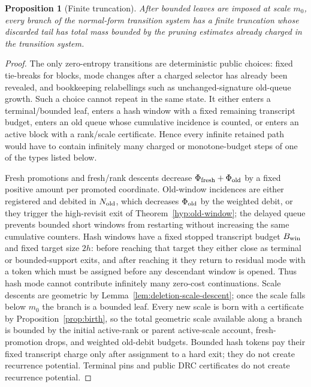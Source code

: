 \documentclass[11pt]{article}
\newtheorem{proposition}[theorem]{Proposition}
\begin{document}
\begin{proposition}[Finite truncation]
\label{prop:finite-truncation}
After bounded leaves are imposed at scale $m_0$, every branch of the
normal-form transition system has a finite truncation whose discarded tail has
total mass bounded by the pruning estimates already charged in the transition
system.
\end{proposition}

\begin{proof}
The only zero-entropy transitions are deterministic public choices: fixed
tie-breaks for blocks, mode changes after a charged selector has already been
revealed, and bookkeeping relabellings such as unchanged-signature old-queue
growth.  Such a choice cannot repeat in the same state.  It either enters a
terminal/bounded leaf, enters a hash window with a fixed remaining transcript
budget, enters an old queue whose cumulative incidence is counted, or enters an
active block with a rank/scale certificate.  Hence every infinite retained path
would have to contain infinitely many charged or monotone-budget steps of one
of the types listed below.

Fresh promotions and fresh/rank descents decrease
$\Phi_{\rm fresh}+\Phi_{\rm old}$ by a fixed positive amount per promoted
coordinate.  Old-window incidences are either registered and debited in
$N_{\rm old}$, which decreases $\Phi_{\rm old}$ by the weighted debit, or they
trigger the high-revisit exit of
Theorem~\ref{hyp:old-window}; the delayed queue prevents bounded short windows
from restarting without increasing the same cumulative counters.
Hash windows have a fixed stopped transcript budget $B_{\rm win}$ and fixed
target size $2h$: before reaching that target they either close as terminal or
bounded-support exits, and after reaching it they return to residual mode with
a token which must be assigned before any descendant window is opened.  Thus
hash mode cannot contribute infinitely many zero-cost continuations.  Scale
descents are geometric by Lemma~\ref{lem:deletion-scale-descent}; once
the scale falls below $m_0$ the branch is a bounded leaf.  Every new scale is
born with a certificate by Proposition~\ref{prop:birth}, so the total
geometric scale available along a branch is bounded by the initial active-rank
or parent active-scale account, fresh-promotion drops, and weighted old-debit
budgets.  Bounded hash
tokens pay their fixed transcript charge only after assignment to a hard exit;
they do not create recurrence potential.  Terminal pins and public DRC
certificates do not create recurrence potential.


\end{proof}
\end{document}
